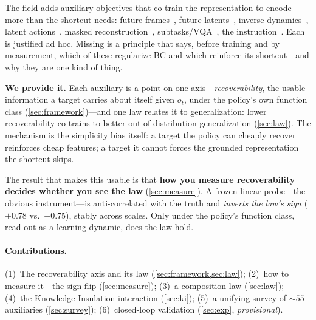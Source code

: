 \documentclass{article}
\newcommand{\prov}[1]{\textcolor{gray!85}{\textit{#1}}} %
\begin{document}
The field adds auxiliary objectives that co-train the representation to encode more than the shortcut needs:
future frames~\citep{gr1,vpp}, future latents~\citep{spr}, inverse dynamics~\citep{vpt}, latent
actions~\citep{lapa}, masked reconstruction~\citep{mvp,vc1}, subtasks/VQA~\citep{rt2,pi05}, the
instruction~\citep{hejna2023}. Each is justified ad hoc. Missing is a principle that says, before training and by
measurement, which of these regularize BC and which reinforce its shortcut---and why they are one kind of thing.

\textbf{We provide it.} Each auxiliary is a point on one axis---\emph{recoverability}, the usable information a
target carries about itself given $o_t$, under the policy's own function class (\cref{sec:framework})---and one law
relates it to generalization: lower recoverability co-trains to better out-of-distribution generalization
(\cref{sec:law}). The mechanism is the simplicity bias itself: a target the policy can cheaply recover reinforces
cheap features; a target it cannot forces the grounded representation the shortcut skips.

The result that makes this usable is that \textbf{how you measure recoverability decides whether you see the law}
(\cref{sec:measure}). A frozen linear probe---the obvious instrument---is anti-correlated with the truth and
\emph{inverts the law's sign} ($+0.78$ vs.\ $-0.75$), stably across scales. Only under the policy's function class,
read out as a learning dynamic, does the law hold.

\paragraph{Contributions.} (1)~The recoverability axis and its law (\cref{sec:framework,sec:law}); (2)~how to
measure it---the sign flip (\cref{sec:measure}); (3)~a composition law (\cref{sec:law}); (4)~the Knowledge
Insulation interaction (\cref{sec:ki}); (5)~a unifying survey of ${\sim}55$ auxiliaries (\cref{sec:survey});
(6)~closed-loop validation (\cref{sec:exp}, \prov{provisional}).
\end{document}
